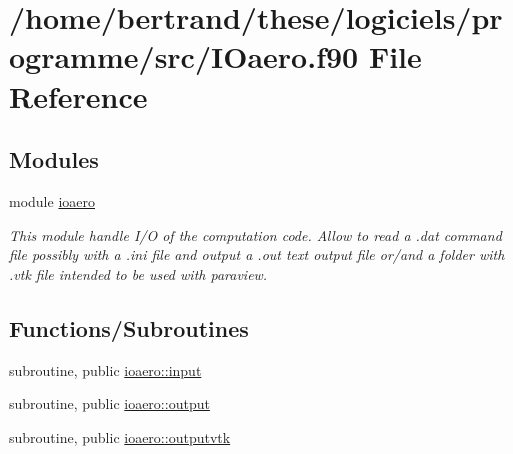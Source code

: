 \hypertarget{_i_oaero_8f90}{}\section{/home/bertrand/these/logiciels/programme/src/\+I\+Oaero.f90 File Reference}
\label{_i_oaero_8f90}
\subsection*{Modules}
\begin{DoxyCompactItemize}
\item 
module \hyperlink{namespaceioaero}{ioaero}
\begin{DoxyCompactList}\small\item\em This module handle I/O of the computation code. Allow to read a .dat command file possibly with a .ini file and output a .out text output file or/and a folder with .vtk file intended to be used with paraview. \end{DoxyCompactList}\end{DoxyCompactItemize}
\subsection*{Functions/\+Subroutines}
\begin{DoxyCompactItemize}
\item 
subroutine, public \hyperlink{namespaceioaero_a039bc1aae10012ce8e368bc202bb81be}{ioaero\+::input}
\item 
subroutine, public \hyperlink{namespaceioaero_a1f2f8f2b4f6e233d2753c1fd1809a44a}{ioaero\+::output}
\item 
subroutine, public \hyperlink{namespaceioaero_a7eb68cb1588d24e05c8f056ca107e163}{ioaero\+::outputvtk}
\end{DoxyCompactItemize}
